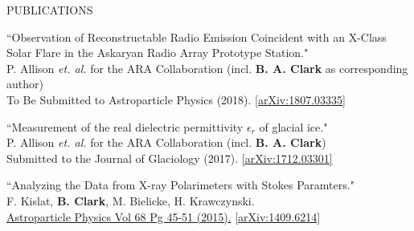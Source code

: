 \documentclass{resume} %
\begin{document}
\begin{rSection}{PUBLICATIONS}
\begin{etaremune}%
 \item ``Observation of Reconstructable Radio Emission Coincident with an X-Class Solar Flare in the Askaryan Radio Array Prototype Station." \\
 P. Allison {\it et. al.} for the ARA Collaboration (incl. \textbf{B. A. Clark} as corresponding author) \\
 To Be Submitted to Astroparticle Physics (2018). \href{https://arxiv.org/abs/1807.03335}{[arXiv:1807.03335]}
  \item ``Measurement of the real dielectric permittivity $\epsilon_r$ of glacial ice." \\
 P. Allison {\it et. al.} for the ARA Collaboration (incl. \textbf{B. A. Clark}) \\
 Submitted to the Journal of Glaciology (2017). \href{https://arxiv.org/abs/1712.03301}{[arXiv:1712.03301]}
   \item ``Analyzing the Data from X-ray Polarimeters with Stokes Paramters." \\
 F. Kislat,  \textbf{B. Clark}, M. Bielicke, H. Krawczynski.  \\
  \href{http://dx.doi.org/10.1016/j.astropartphys.2015.02.007}{Astroparticle Physics Vol 68 Pg 45-51 (2015).} \href{https://arxiv.org/abs/1409.6214}{[arXiv:1409.6214]} 
 \end{etaremune}
\end{rSection}

\end{document}
